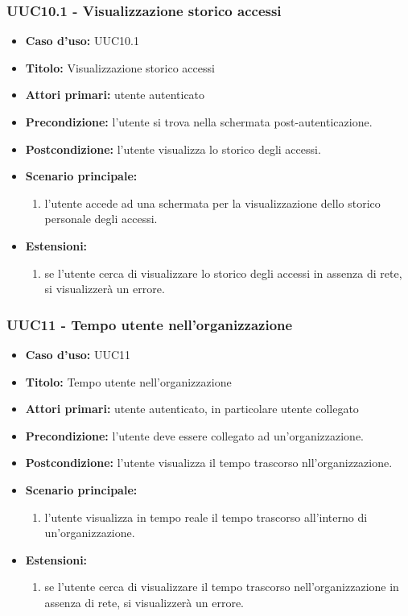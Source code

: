 \documentclass[casi-duso]{subfiles}
\begin{document}
\subsubsection{UUC10.1 - Visualizzazione storico accessi}
\label{subsub:UUC10.1utente}
\begin{itemize}
  \item \textbf{Caso d’uso:} UUC10.1
  \item \textbf{Titolo:} Visualizzazione storico accessi
  \item \textbf{Attori primari:} utente autenticato
  \item \textbf{Precondizione:} l'utente si trova nella schermata post-autenticazione.
  \item \textbf{Postcondizione:} l'utente visualizza lo storico degli accessi.
  \item \textbf{Scenario principale:} 
  \begin{enumerate}
    \item l'utente accede ad una schermata per la visualizzazione dello storico personale degli accessi.
  \end{enumerate}
  \item \textbf{Estensioni:} 
  \begin{enumerate}
    \item se l'utente cerca di visualizzare lo storico degli accessi in assenza di rete, si visualizzerà un errore.
  \end{enumerate} 
\end{itemize}

\subsubsection{UUC11 - Tempo utente nell'organizzazione}
\label{subsub:UUC11utente}
\begin{itemize}
  \item \textbf{Caso d’uso:} UUC11
  \item \textbf{Titolo:} Tempo utente nell'organizzazione
  \item \textbf{Attori primari:} utente autenticato, in particolare utente collegato
  \item \textbf{Precondizione:} l'utente deve essere collegato ad un'organizzazione.
  \item \textbf{Postcondizione:} l'utente visualizza il tempo trascorso nll'organizzazione.
  \item \textbf{Scenario principale:} 
  \begin{enumerate}
    \item l'utente visualizza in tempo reale il tempo trascorso all'interno di un'organizzazione.
  \end{enumerate}  
  \item \textbf{Estensioni:} 
  \begin{enumerate}
    \item se l'utente cerca di visualizzare il tempo trascorso nell'organizzazione in assenza di rete, si visualizzerà un errore.
  \end{enumerate}  
\end{itemize}
\end{document}

